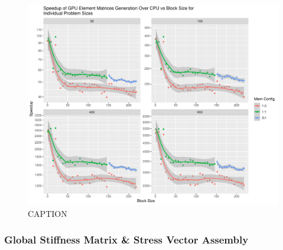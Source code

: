 \begin{figure}
	\centering
	\includegraphics[width=0.9\linewidth]{Plots/elem_mats_dev_speedups_reconfig}
	\caption{CAPTION}
	\label{fig:elems_reconfig}
\end{figure}

\subsubsection{Global Stiffness Matrix \& Stress Vector Assembly}

